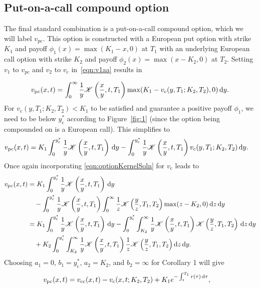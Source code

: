 \subsection{Put-on-a-call compound option}
The final standard combination is a put-on-a-call compound option, which we will label $v_\text{pc}$. This option is constructed with a European put option with strike $K_1$ and payoff $\phi_1(x) = \max(K_1-x,0)$ at $T_1$ with an underlying European call option with strike $K_2$ and payoff $\phi_2(x) = \max(x-K_2,0)$ at $T_2$. Setting $v_1$ to $v_\text{pc}$ and $v_2$ to $v_\text{c}$ in~\eqref{eqn:v1aa} results in

\begin{equation*}
		v_{\text{pc}}(x,t) = \int_0^\infty \frac{1}{y} \mathscr K\left( \frac{x}{y}, t, T_1 \right)\max(K_1 -v_\text{c}(y,T_1; K_2, T_2), 0)\, \mathrm d y.
	\end{equation*}
For $v_{\text{c}}(y,T_1; K_2, T_2) < K_1$ to be satisfied and guarantee a positive payoff $\phi_1$, we need to be below $y_\text{c}^*$ according to Figure~\ref{fig:1} (since the option being compounded on is a European call). This simplifies  to
	\begin{align*}
		v_\text{pc}(x,t) &= K_1\int_{0}^{y_\mathrm{c}^*} \frac{1}{y}\mathscr K\left( \frac{x}{y}, t, T_1 \right) \, \mathrm d y - \int_{0}^{y_\mathrm{c}^*} \frac{1}{y} \mathscr K\left( \frac{x}{y}, t, T_1 \right)v_\text{c}(y,T_1; K_2, T_2) \, \mathrm d y.
	\end{align*}
Once again incorporating \eqref{eqn:optionKernelSoln} for $v_\text{c}$ leads to
	\begin{align*}
		v_\text{pc}(x,t) &= K_1\int_{0}^{y_\mathrm{c}^*} \frac{1}{y}\mathscr K\left( \frac{x}{y}, t, T_1 \right) \, \mathrm d y \\
		&\quad - \int_0^{y_\mathrm{c}^*}\frac{1}{y}\mathscr K\left( \frac{x}{y}, t, T_1 \right)\int_0^\infty \frac{1}{z} \mathscr K\left( \frac{y}{z}, T_1, T_2 \right)\max(z-K_2,0) \, \mathrm d z \, \mathrm d y \\
		&= K_1\int_{0}^{y_\mathrm{c}^*} \frac{1}{y}\mathscr K\left( \frac{x}{y}, t, T_1 \right) \, \mathrm d y - \int_0^{y_\mathrm{c}^*}\int_{K_2}^\infty \frac{1}{y}\mathscr K\left( \frac{x}{y},t,T_1 \right)\mathscr K\left( \frac{y}{z}, T_1, T_2 \right) \, \mathrm d z \, \mathrm d y \\
		&\quad + K_2\int_0^{y_\mathrm{c}^*}\int_{K_2}^\infty\frac{1}{y}\mathscr K\left( \frac{x}{y}, t, T_1 \right) \frac{1}{z} \mathscr K\left( \frac{y}{z}, T_1, T_2 \right) \mathrm d z \, \mathrm d y .
	\end{align*}
Choosing $a_1 = 0$, $b_1 = y_\mathrm{c}^*$, $a_2 = K_2$, and $b_2 = \infty$ for Corollary 1 will give
\begin{equation}
		\label{eqn:vpc}
		\begin{split}
		v_\text{pc}(x,t) &= v_\text{cc}(x,t) - v_\text{c}(x,t;K_2,T_2) + K_1e^{-\int_t^{T_1} r(\tau) \, \mathrm d\tau},
		\end{split}
	\end{equation}
